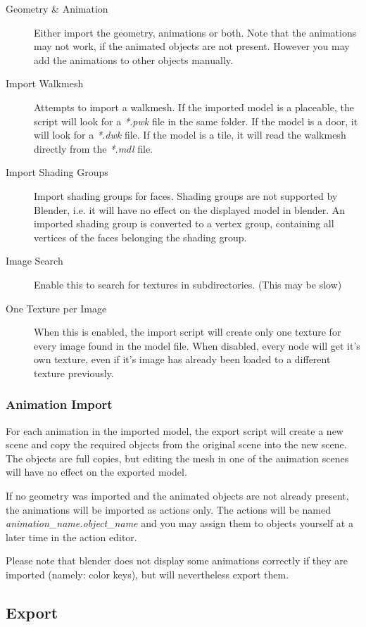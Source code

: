 \documentclass[a4paper]{article}
\begin{document}
\begin{description}
    \item[Geometry \& Animation] Either import the geometry, animations or both. Note that the animations may not work, if the animated objects are not present. However you may add the animations to other objects manually.
    \item[Import Walkmesh] Attempts to import a walkmesh. If the imported model is a placeable, the script will look for a {\itshape{*.pwk}} file in the same folder. If the model is a door, it will look for a {\itshape{*.dwk}} file. If the model is a tile, it will read the walkmesh directly from the {\itshape{*.mdl}} file.
    \item[Import Shading Groups] Import shading groups for faces. Shading groups are not supported by Blender, i.e. it will have no effect on the displayed model in blender. An imported shading group is converted to a vertex group, containing all vertices of the faces belonging the shading group.
    \item[Image Search] Enable this to search for textures in subdirectories. (This may be slow)
    \item[One Texture per Image] When this is enabled, the import script will create only one texture for every image found in the model file. When disabled, every node will get it's own texture, even if it's image has already been loaded to a different texture previously.
\end{description}

\subsubsection*{Animation Import}
For each animation in the imported model, the export script will create a new scene and copy the required objects from the original scene into the new scene. The objects are full copies, but editing the mesh in one of the animation scenes will have no effect on the exported model.

If no geometry was imported and the animated objects are not already present, the animations will be imported as actions only. The actions will be named {\itshape{animation\_name.object\_name}} and you may assign them to objects yourself at a later time in the action editor.

Please note that blender does not display some animations correctly if they are imported (namely: color keys), but will nevertheless export them.

\subsection{Export}
\end{document}
